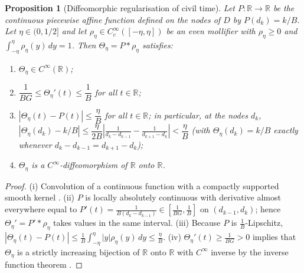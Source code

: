 \documentclass[11pt, a4paper]{article}
\theoremstyle{definition}
\theoremstyle{plain}
\newtheorem{proposicao}[definicao]{Proposition}
\theoremstyle{remark}
\begin{document}
\begin{proposicao}[Diffeomorphic regularisation of civil time]\label{prop:2.2}
Let $P : \mathbb{R} \to \mathbb{R}$ be the continuous piecewise affine function defined on the nodes of $D$ by $P(d_k) = k/B$. Let $\eta \in (0, 1/2]$ and let $\rho_\eta \in C_c^\infty([-\eta, \eta])$ be an even mollifier with $\rho_\eta \ge 0$ and $\int_{-\eta}^{\eta} \rho_\eta(y)\,dy = 1$. Then $\Theta_\eta = P * \rho_\eta$ satisfies:
\begin{enumerate}[label=(\roman*)]
    \item $\Theta_\eta \in C^\infty(\mathbb{R})$;
    \item $\dfrac{1}{BG} \le \Theta_\eta'(t) \le \dfrac{1}{B}$ for all $t \in \mathbb{R}$;
    \item $|\Theta_\eta(t) - P(t)| \le \dfrac{\eta}{B}$ for all $t \in \mathbb{R}$; in particular, at the nodes $d_k$, $|\Theta_\eta(d_k) - k/B| \le \dfrac{\eta}{2B}\left|\frac{1}{d_k - d_{k-1}} - \frac{1}{d_{k+1} - d_k}\right| < \dfrac{\eta}{B}$ (with $\Theta_\eta(d_k) = k/B$ exactly whenever $d_k - d_{k-1} = d_{k+1} - d_k$);
    \item $\Theta_\eta$ is a $C^\infty$-diffeomorphism of $\mathbb{R}$ onto $\mathbb{R}$.
\end{enumerate}
\end{proposicao}
\begin{proof}
(i) Convolution of a continuous function with a compactly supported smooth kernel \cite[Chap.~4]{Brezis2011}. (ii) $P$ is locally absolutely continuous with derivative almost everywhere equal to $P'(t) = \frac{1}{B(d_k - d_{k-1})} \in [\frac{1}{BG}, \frac{1}{B}]$ on $(d_{k-1}, d_k)$; hence $\Theta_\eta' = P' * \rho_\eta$ takes values in the same interval. (iii) Because $P$ is $\frac{1}{B}$-Lipschitz, $|\Theta_\eta(t) - P(t)| \le \frac{1}{B}\int_{-\eta}^{\eta} |y|\rho_\eta(y)\,dy \le \frac{\eta}{B}$. (iv) $\Theta_\eta'(t) \ge \frac{1}{BG} > 0$ implies that $\Theta_\eta$ is a strictly increasing bijection of $\mathbb{R}$ onto $\mathbb{R}$ with $C^\infty$ inverse by the inverse function theorem \cite[vol.~2]{LimaAnalise2}.
\end{proof}
\end{document}
